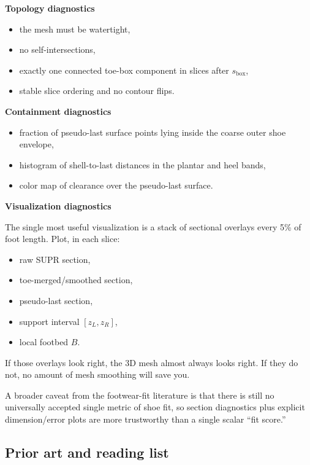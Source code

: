 \documentclass[
  10.5pt,
]{article}
\providecommand{\tightlist}{%
  \setlength{\itemsep}{0pt}\setlength{\parskip}{0pt}}
\begin{document}
\textbf{Topology diagnostics}

\begin{itemize}
\tightlist
\item
  the mesh must be watertight,
\item
  no self-intersections,
\item
  exactly one connected toe-box component in slices after
  \(s_{\text{box}}\),
\item
  stable slice ordering and no contour flips.
\end{itemize}

\textbf{Containment diagnostics}

\begin{itemize}
\tightlist
\item
  fraction of pseudo-last surface points lying inside the coarse outer
  shoe envelope,
\item
  histogram of shell-to-last distances in the plantar and heel bands,
\item
  color map of clearance over the pseudo-last surface.
\end{itemize}

\textbf{Visualization diagnostics}

The single most useful visualization is a stack of sectional overlays
every 5\% of foot length. Plot, in each slice:

\begin{itemize}
\tightlist
\item
  raw SUPR section,
\item
  toe-merged/smoothed section,
\item
  pseudo-last section,
\item
  support interval \([z_L,z_R]\),
\item
  local footbed \(B\).
\end{itemize}

If those overlays look right, the 3D mesh almost always looks right. If
they do not, no amount of mesh smoothing will save you.

A broader caveat from the footwear-fit literature is that there is still
no universally accepted single metric of shoe fit, so section
diagnostics plus explicit dimension/error plots are more trustworthy
than a single scalar ``fit score.''

\subsection{Prior art and reading
list}\label{prior-art-and-reading-list}
\end{document}
